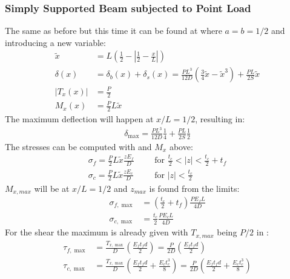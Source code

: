 \documentclass[10pt,a4paper,20pt]{article}
\begin{document}
\subsubsection{Simply Supported Beam subjected to Point Load}
The same as before but this time it can be found at \cite[p. 4.21 s. 4.9.4]{IntroSW} where $a=b=1/2$ and introducing a new variable:
\begin{align}
\tilde{x} &= L\left(\frac{1}{2}-\left|\frac{1}{2}-\frac{x}{L}\right|\right)\\
\delta(x) &= \delta_b(x)+ \delta_s(x) = \frac{PL^3}{12 D}\left(\frac{3}{4}\tilde{x}-\tilde{x}^3\right) + \frac{PL}{2 S}\tilde{x}\\
|T_x(x)| &= \frac{P}{2}\\
M_x(x) &= \frac{P}{2}L\tilde{x}
\end{align}
The maximum deflection will happen at $x/L = 1/2$, resulting in:
\begin{align}
\delta_{\max} = \frac{PL^3}{12 D} \frac{1}{4} + \frac{PL}{2 S} \frac{1}{2}
\end{align}  
The stresses can be computed with \cite[p. 3.3 eq. 3.8]{IntroSW} and $M_x$ above:
\begin{align}
\sigma_f =  \frac{P}{2}L\tilde{x}\frac{z E_f}{D} && &\text{for } \frac{t_c}{2}<|z|<\frac{t_c}{2} + t_f \\
\sigma_c = \frac{P}{2}L\tilde{x}\frac{z E_c}{D} && &\text{for } |z|<\frac{t_c}{2}
\end{align}
$M_{x,max}$ will be at $x/L = 1/2$ and $z_{max}$ is found from the limits:
\begin{align}
\sigma_{f,\max} &= \left(\frac{t_c}{2}+t_f\right)\frac{P E_f L}{4 D}  \\
\sigma_{c,\max} &= \frac{t_c}{2}\frac{P E_c L}{4 D}
\end{align}
For the shear the maximum is already given with $T_{x,max}$ being $P/2$ in \cite[p. 3.4 eq. 3.14 and 3.15]{IntroSW}:
\begin{align}
\tau_{f,\max} &= \frac{T_{x,\max}}{D}\left(\frac{E_f t_f d}{2}\right) = \frac{P}{2D}\left(\frac{E_f t_f d}{2}\right) \\
\tau_{c,\max} &= \frac{T_{x,\max}}{D}\left(\frac{E_f t_f d}{2}+\frac{E_ct_c^3}{8}\right) = \frac{P}{2D}\left(\frac{E_f t_f d}{2}+\frac{E_ct_c^3}{8}\right)
\end{align}
\end{document}
